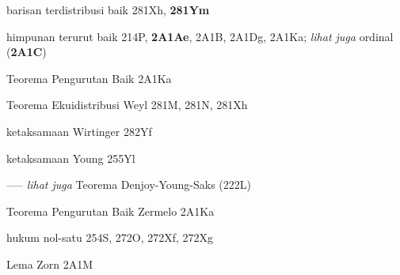 barisan terdistribusi baik 281Xh, {\bf 281Ym}








himpunan terurut baik 214P, {\bf 2A1Ae}, 2A1B, 2A1Dg, 2A1Ka; 
  {\it lihat juga} ordinal ({\bf 2A1C})


Teorema Pengurutan Baik 2A1Ka








 Teorema Ekuidistribusi Weyl 281M, 281N, 281Xh












ketaksamaan Wirtinger 282Yf












\indexmedskip



ketaksamaan Young 255Yl


----- {\it lihat juga} Teorema Denjoy-Young-Saks (222L)



\indexmedskip

Teorema Pengurutan Baik Zermelo 2A1Ka






hukum nol-satu 254S, 272O, 272Xf, 272Xg








Lema Zorn 2A1M



\indexmedskip 
















